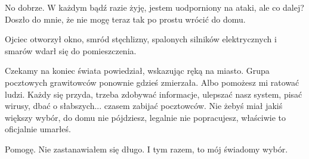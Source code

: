 \ds{} No dobrze. W każdym bądź razie żyję, jestem uodporniony na ataki, ale co dalej? \dm{} Doszło do mnie, że nie mogę teraz tak po prostu wrócić do domu.\de{}

Ojciec otworzył okno, smród stęchlizny, spalonych silników elektrycznych i smarów wdarł się do pomieszczenia.

\ds{} Czekamy na koniec świata \dm{} powiedział, wskazując ręką na miasto. Grupa pocztowych grawitowców ponownie gdzieś zmierzała. \dm{}
Albo pomożesz mi ratować ludzi. Każdy się przyda, trzeba zdobywać informacje, ulepszać nasz system, pisać wirusy, dbać o słabszych... czasem zabijać pocztowców. 
Nie żebyś miał jakiś większy wybór, do domu nie pójdziesz, legalnie nie popracujesz, właściwie to oficjalnie umarłeś. \de{}

\ds{} Pomogę. \dm{} Nie zastanawiałem się długo. \dm{} I tym razem, to mój świadomy wybór. \de{}












